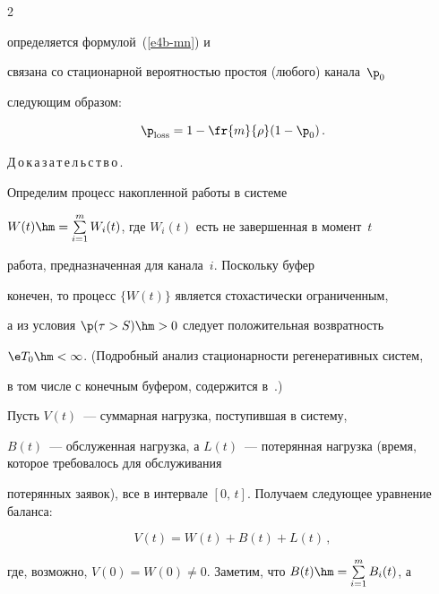 \begin{multicols}{2}
{определяется формулой~(\ref{e4b-mn}) и


  связана со стационарной  вероятностью простоя (любого) канала~$\p_0$


следующим образом:} 


\begin{equation} 




\p_{\mathrm{loss}}=1-\fr{m}{\rho}(1-\p_0)\,.


 \label{e4-mn}


\end{equation}





\smallskip





\noindent


Д\,о\,к\,а\,з\,а\,т\,е\,л\,ь\,с\,т\,в\,о\,.\


Определим процесс накопленной работы в сис\-те\-ме


$W(t)\hm=\sum\limits_{i=1}^mW_i(t)$, где $W_i(t)$ есть не завершенная  в момент~$t$ 


работа, предназначенная для   канала~$i$. Поскольку буфер


конечен, то процесс $\{W(t)\}$  является стохастически ограниченным, 


а из условия $\p(\tau>S)\hm>0$ следует  положительная возвратность


 $\e T_0\hm<\infty$.  (Подробный анализ стационарности регенеративных сис\-тем, 


 в том числе с конечным буфером, содержится в~\cite{Morozov2004, MorozovDelgado}.) 


 Пусть  $V(t)$~--- суммарная нагрузка, поступившая в сис\-те\-му, 


 $B(t)$~--- обслуженная нагрузка, а $L(t)$~--- потерянная нагрузка (время, которое требовалось для обслуживания


потерянных заявок), все в интервале $[0,\,t]$. Получаем следующее уравнение баланса:


\begin{equation}


 V(t)=W(t)+B(t)+L(t)\,,


 \label{bal}


\end{equation} 


где, возможно, $V(0)=W(0)\not =0$. Заметим, что $B(t)\hm=\sum\limits_{i=1}^mB_i(t)$, а 






\end{multicols}
